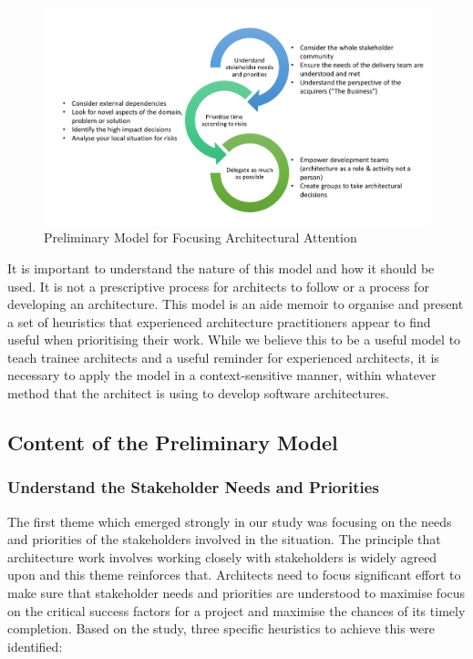 \begin{figure}
\centering
\includegraphics[width=\textwidth]{Figures/prioritisation-prelim-model}
\caption{Preliminary Model for Focusing Architectural Attention}
\label{figure:prelmodel}
\end{figure}  

It is important to understand the nature of this model and how it should be used.  It is not a prescriptive process for architects to follow or a process for developing an architecture.  This model is an aide memoir to organise and present a set of heuristics that experienced architecture practitioners appear to find useful when prioritising their work.  While we believe this to be a useful model to teach trainee architects and a useful reminder for experienced architects, it is necessary to apply the model in a context-sensitive manner, within whatever method that the architect is using to develop software architectures.

\subsection{Content of the Preliminary Model}
\label{sec:prelim-model-content}

\subsubsection{Understand the Stakeholder Needs and Priorities}

The first theme which emerged strongly in our study was focusing on the needs and priorities of the stakeholders involved in the situation.  The principle that architecture work involves working closely with stakeholders is widely agreed upon \cite{rozanski2011-ssa2e, bass2012-sainp} and this theme reinforces that. Architects need to focus significant effort to make sure that stakeholder needs and priorities are understood to maximise focus on the critical success factors for a project and maximise the chances of its timely completion.  Based on the study, three specific heuristics to achieve this were identified:

